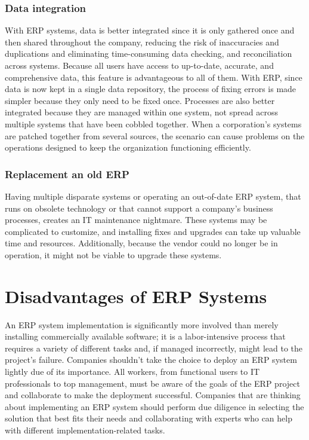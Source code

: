 \subsubsection{Data integration}
With ERP systems, data is better integrated since it is only gathered once and then shared throughout the company, reducing the risk of inaccuracies and duplications and eliminating time-consuming data checking, and reconciliation across systems. Because all users have access to up-to-date, accurate, and comprehensive data, this feature is advantageous to all of them. With ERP, since data is now kept in a single data repository, the process of fixing errors is made simpler because they only need to be fixed once.
Processes are also better integrated because they are managed within one system, not spread across multiple systems that have been cobbled together. When a corporation's systems are patched together from several sources, the scenario can cause problems on the operations designed to keep the organization functioning efficiently.

\subsubsection{Replacement an old ERP}
Having multiple disparate systems or operating an out-of-date ERP system, that runs on obsolete technology or that cannot support a company’s business processes, creates an IT maintenance nightmare. These systems may be complicated to customize, and installing fixes and upgrades can take up valuable time and resources. Additionally, because the vendor could no longer be in operation, it might not be viable to upgrade these systems.

\section{Disadvantages of ERP Systems}
An ERP system implementation is significantly more involved than merely installing commercially available software; it is a labor-intensive process that requires a variety of different tasks and, if managed incorrectly, might lead to the project's failure.
Companies shouldn't take the choice to deploy an ERP system lightly due of its importance. All workers, from functional users to IT professionals to top management, must be aware of the goals of the ERP project and collaborate to make the deployment successful.
Companies that are thinking about implementing an ERP system should perform due diligence in selecting the solution that best fits their needs and collaborating with experts who can help with different implementation-related tasks.

